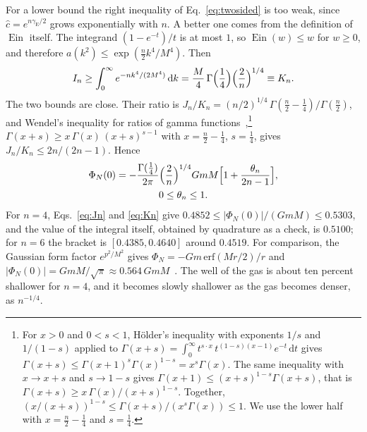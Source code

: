 \documentclass[aps,prd,10pt,twocolumn,superscriptaddress,nofootinbib,floatfix,longbibliography]{revtex4-2}
\newcommand{\dd}{\mathrm{d}}
\newcommand{\Ein}{\operatorname{Ein}}
\newcommand{\gE}{\gamma_{\mathrm E}}
\begin{document}
For a lower bound the right inequality of Eq.~\eqref{eq:twosided} is too weak, since $\hat c=e^{n\gE/2}$ grows exponentially with $n$. A better one comes from the definition of $\Ein$ itself. The integrand $(1-e^{-t})/t$ is at most $1$, so $\Ein(w)\le w$ for $w\ge0$, and therefore $a(k^2)\le\exp(\frac n2k^4/M^4)$. Then
\begin{equation}
\label{eq:Kn}
I_n\ge\int_0^\infty e^{-nk^4/(2M^4)}\,\dd k=\frac M4\,\Gamma\Bigl(\frac14\Bigr)\Bigl(\frac2n\Bigr)^{1/4}\equiv K_n .
\end{equation}
The two bounds are close. Their ratio is $J_n/K_n=(n/2)^{1/4}\,\Gamma(\frac n2-\frac14)/\Gamma(\frac n2)$, and Wendel's inequality for ratios of gamma functions~\cite{Wendel1948},\footnote{For $x>0$ and $0<s<1$, H\"older's inequality with exponents $1/s$ and $1/(1-s)$ applied to $\Gamma(x+s)=\int_0^\infty t^{s\cdot x}\,t^{(1-s)(x-1)}e^{-t}\,\dd t$ gives $\Gamma(x+s)\le\Gamma(x+1)^s\Gamma(x)^{1-s}=x^s\Gamma(x)$. The same inequality with $x\to x+s$ and $s\to1-s$ gives $\Gamma(x+1)\le(x+s)^{1-s}\Gamma(x+s)$, that is $\Gamma(x+s)\ge x\,\Gamma(x)/(x+s)^{1-s}$. Together, $(x/(x+s))^{1-s}\le\Gamma(x+s)/(x^s\Gamma(x))\le1$. We use the lower half with $x=\frac n2-\frac14$ and $s=\frac14$.} $\Gamma(x+s)\ge x\,\Gamma(x)\,(x+s)^{s-1}$ with $x=\frac n2-\frac14$, $s=\frac14$, gives $J_n/K_n\le 2n/(2n-1)$. Hence
\begin{equation}
\label{eq:pot0-sharp}
\begin{gathered}
\Phi_N(0)=-\frac{\Gamma(\frac14)}{2\pi}\Bigl(\frac2n\Bigr)^{1/4}GmM\Bigl[1+\frac{\theta_n}{2n-1}\Bigr],\\
0\le\theta_n\le1 .
\end{gathered}
\end{equation}
For $n=4$, Eqs.~\eqref{eq:Jn} and \eqref{eq:Kn} give $0.4852\le|\Phi_N(0)|/(GmM)\le0.5303$, and the value of the integral itself, obtained by quadrature as a check, is $0.5100$; for $n=6$ the bracket is $[0.4385,0.4640]$ around $0.4519$. For comparison, the Gaussian form factor $e^{p^2/M^2}$ gives $\Phi_N=-Gm\,\mathrm{erf}(Mr/2)/r$ and $|\Phi_N(0)|=GmM/\sqrt\pi\approx0.564\,GmM$~\cite{BGKM2012,EdholmKoshelevMazumdar2016}. The well of the gas is about ten percent shallower for $n=4$, and it becomes slowly shallower as the gas becomes denser, as $n^{-1/4}$.
\end{document}
